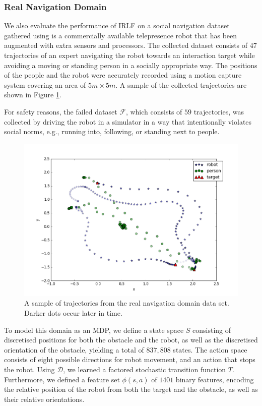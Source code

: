 \documentclass[a4paper,11pt]{report}
\begin{document}
\subsubsection{Real Navigation Domain}

We also evaluate the performance of IRLF on a social navigation dataset gathered using is a commercially available telepresence robot that has been augmented with extra sensors and processors. The collected dataset consists of 47 trajectories of an expert navigating the robot towards an interaction target while avoiding a moving or standing  person in a socially appropriate way. The positions of the people and the robot were accurately recorded using a motion capture system covering an area of $5m \times 5m$. A sample of the collected trajectories are shown in Figure \ref{fig:data}. 

For safety reasons, the failed dataset $\mathcal{F}$, which consists of $59$ trajectories, was collected by driving the robot in a simulator in a way that intentionally violates social norms, e.g., running into, following, or standing next to people. 

\begin{figure}[t]     
  \centering
    \includegraphics[width=0.55\columnwidth]{figures/data_plot.png}
  \caption{A sample of trajectories from the real navigation domain data set. Darker dots occur later in time.}
  \label{fig:data}
\end{figure}

To model this domain as an MDP, we define a state space $S$ consisting of discretised positions for both the obstacle and the robot, as well as the discretised orientation of the obstacle, yielding a total of $837,808$ states. The action space consists of eight possible directions for robot movement, and an action that stops the robot. Using $\mathcal{D}$, we learned a factored stochastic transition function $T$. Furthermore, we defined a feature set $\phi(s,a)$ of $1401$ binary features, encoding the relative position of the robot from both the target and the obstacle, as well as their relative orientations. 
\end{document}
